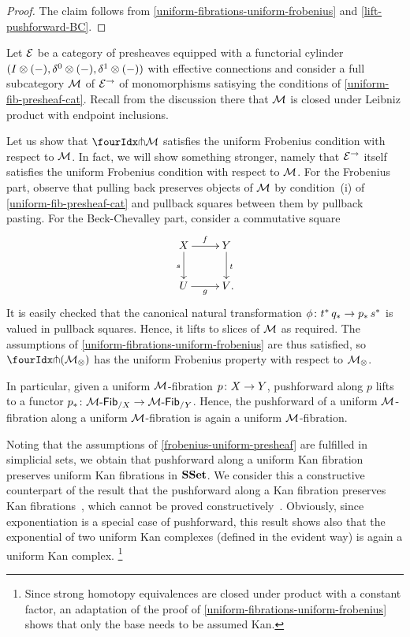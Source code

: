 \documentclass[reqno,10pt,a4paper,oneside,draft]{amsart}
\begin{document}
\begin{proof}
The claim follows from \cref{uniform-fibrations-uniform-frobenius} and \cref{lift-pushforward-BC}.
\end{proof}

\begin{example} \label{frobenius-uniform-presheaf}
Let $\catE$ be a category of presheaves equipped with a functorial cylinder $(\interval \otimes (-), \lcyl \otimes (-), \rcyl \otimes (-))$ with effective connections and consider a full subcategory $\cal{M}$ of $\catE^\to$ of monomorphisms satisying the conditions of \cref{uniform-fib-presheaf-cat}.
Recall from the discussion there that $\cal{M}$ is closed under Leibniz product with endpoint inclusions.

Let us show that $\liftr{\cal{M}}$ satisfies the uniform Frobenius condition with respect to $\cal{M}$.
In fact, we will show something stronger, namely that $\catE^\to$ itself satisfies the uniform Frobenius condition with respect to $\cal{M}$.
For the Frobenius part, observe that pulling back preserves objects of $\cal{M}$ by condition~(i) of \cref{uniform-fib-presheaf-cat} and pullback squares between them by pullback pasting.
For the Beck-Chevalley part, consider a commutative square
\[
\xymatrix{
  X
  \ar[r]^{f}
  \ar[d]_{s}
&
  Y
  \ar[d]^{t}
\\
  U
  \ar[r]_{g}
&
  V
\rlap{.}}
\]
It is easily checked that the canonical natural transformation $\phi \co t^* \, q_* \to p_* \, s^*$ is valued in pullback squares.
Hence, it lifts to slices of $\cal{M}$ as required.
The assumptions of \cref{uniform-fibrations-uniform-frobenius} are thus satisfied, so $\liftr{(\cal{M}_\otimes)}$ has the uniform Frobenius property with respect to $\cal{M}_\otimes$.

In particular, given a uniform $\cal{M}$-fibration $p \co X \to Y$, pushforward along $p$ lifts to a functor $p_* \co \Fib{\cal{M}}_{/X} \to \Fib{\cal{M}}_{/Y}$.
Hence, the pushforward of a uniform $\cal{M}$-fibration along a uniform $\cal{M}$-fibration is again a uniform $\cal{M}$-fibration.
\end{example}

\begin{example}
Noting that the assumptions of \cref{frobenius-uniform-presheaf} are fulfilled in simplicial sets, we obtain that pushforward along a uniform Kan fibration preserves uniform Kan fibrations in $\SSet$.
We consider this a constructive counterpart of the result that the pushforward along a Kan fibration preserves Kan fibrations~\cite{voevodsky-simplicial-model}, which cannot be proved constructively~\cite{coquand-non-constructivity-kan}.
Obviously, since exponentiation is a special case of pushforward, this result shows also that the exponential of two uniform Kan complexes (defined in the evident way) is again a uniform Kan complex.%
\footnote{Since strong homotopy equivalences are closed under product with a constant factor, an adaptation of the proof of \cref{uniform-fibrations-uniform-frobenius} shows that only the base needs to be assumed Kan.}
\end{example}
\end{document}
